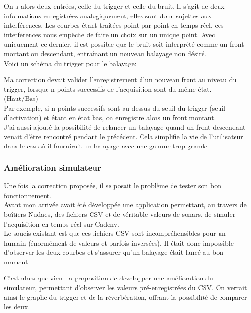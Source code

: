 \documentclass{rapport}
\begin{document}
On a alors deux entrées, celle du trigger et celle du bruit. Il s'agit de deux informations enregistrées analogiquement, elles sont donc sujettes aux interférences. Les courbes étant traitées point par point en temps réel, ces interférences nous empêche de faire un choix sur un unique point. Avec uniquement ce dernier, il est possible que le bruit soit interprété comme un front montant ou descendant, entraînant un nouveau balayage non désiré.\\

Voici un schéma du trigger pour le balayage:



Ma correction devait valider l'enregistrement d'un nouveau front au niveau du trigger, lorsque n points successifs de l'acquisition sont du même état. (Haut/Bas)\\
Par exemple, si n points successifs sont au-dessus du seuil du trigger (seuil d'activation) et étant en état bas, on enregistre alors un front montant.\\

J'ai aussi ajouté la possibilité de relancer un balayage quand un front descendant venait d'être rencontré pendant le précédent. Cela simplifie la vie de l'utilisateur dans le cas où il fournirait un balayage avec une gamme trop grande.

\subsubsection{Amélioration simulateur}

Une fois la correction proposée, il se posait le problème de tester son bon fonctionnement. \\

Avant mon arrivée avait été développée une application permettant, au travers de boîtiers Nudaqs, des fichiers CSV et de véritable valeurs de sonars, de simuler l'acquisition en temps réel sur Cadenv.\\
Le soucis existant est que ces fichiers CSV sont incompréhensibles pour un humain (énormément de valeurs et parfois inversées). Il était donc impossible d'observer les deux courbes et s'assurer qu'un balayage était lancé au bon moment.


C'est alors que vient la proposition de développer une amélioration du simulateur, permettant d'observer les valeurs pré-enregistrées du CSV. On verrait ainsi le graphe du trigger et de la réverbération, offrant la possibilité de comparer les deux.
\end{document}
